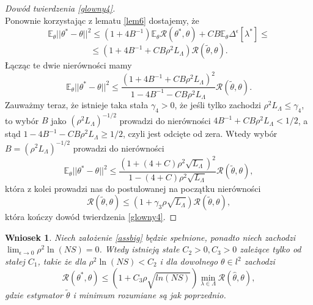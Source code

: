 \documentclass{article}
\newtheorem{wn}{Wniosek}
\begin{document}
\begin{proof}[Dowód twierdzenia \ref{glowny4}]
\begin{displaymath}
\end{displaymath}
Ponownie korzystając z lematu \ref{lem6} dostajemy, że
\begin{displaymath}
\mathbb{E}_{\theta}||\theta^*-\theta||^2\leq (1+4B^{-1})\mathbb{E}_{\theta}\mathcal{R}(\theta^*,\theta)+CB\mathbb{E}_{\theta}\Delta^{\epsilon}[\lambda^*]\leq
\end{displaymath}
\begin{displaymath}
\leq (1+4B^{-1}+CB\rho^2L_{\Lambda})\mathcal{R}(\tilde{\theta},\theta).
\end{displaymath}
Łącząc te dwie nierówności mamy
\begin{displaymath}
\mathbb{E}_{\theta}||\theta^*-\theta||^2\leq \frac{(1+4B^{-1}+CB\rho^2L_{\Lambda})^2}{1-4B^{-1}-CB\rho^2L_{\Lambda}}\mathcal{R}(\tilde{\theta},\theta).
\end{displaymath}
Zauważmy teraz, że istnieje taka stała $\gamma_4>0$, że jeśli tylko zachodzi $\rho^2L_{\Lambda}\leq \gamma_4$, to wybór $B$ jako $(\rho^2L_{\Lambda})^{-1/2}$ prowadzi do nierówności $4B^{-1}+CB\rho^2L_{\Lambda}<1/2$, a stąd $1-4B^{-1}-CB\rho^2L_{\Lambda}\geq 1/2$, czyli jest odcięte od zera. Wtedy wybór $B=(\rho^2L_{\Lambda})^{-1/2}$ prowadzi do nierówności
\begin{displaymath}
\mathbb{E}_{\theta}||\theta^*-\theta||^2\leq \frac{(1+(4+C)\rho^2\sqrt{L_{\Lambda}})^2}{1-(4+C)\rho^2\sqrt{L_{\Lambda}}}\mathcal{R}(\tilde{\theta},\theta),
\end{displaymath}
która z kolei prowadzi nas do postulowanej na początku nierówności
\begin{displaymath}
\mathcal{R}(\tilde{\theta},\theta)\leq (1+\gamma_3\rho\sqrt{L_{\Lambda}})\mathcal{R}(\tilde{\theta},\theta),
\end{displaymath}
która kończy dowód twierdzenia \ref{glowny4}.
\end{proof}


\begin{wn}
Niech założenie \ref{assbig} będzie spełnione, ponadto niech zachodzi $\lim_{\epsilon\to 0}\rho^2\ln(NS)=0$. Wtedy istnieją stałe $C_2>0,C_3>0$ zależące tylko od stałej $C_1$, takie że dla $\rho^2\ln(NS)<C_2$ i dla dowolnego $\theta\in l^2$ zachodzi
\begin{displaymath}
\mathcal{R}(\theta^*,\theta)\leq \left(1+C_3\rho\sqrt{ln(NS)}\right)\min_{\lambda\in \Lambda}\mathcal{R}(\hat{\theta},\theta),
\end{displaymath}
gdzie estymator $\tilde{\theta}$ i minimum rozumiane są jak poprzednio.
\end{wn}
\end{document}

